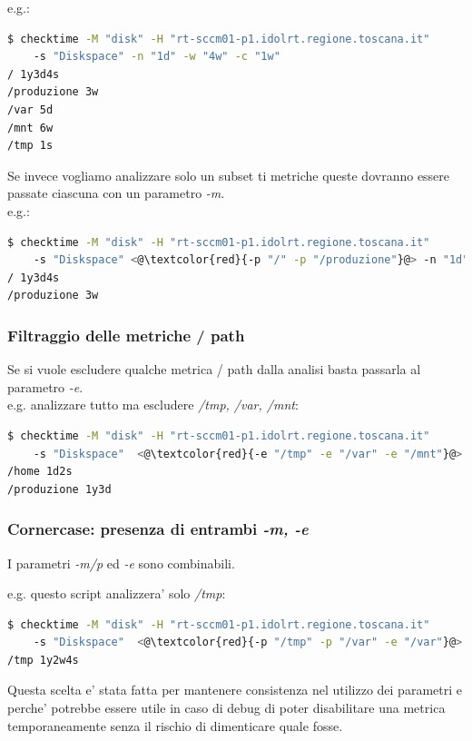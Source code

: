 \documentclass{article}
\begin{document}
e.g.:
\begin{lstlisting}[language=Bash]
$ checktime -M "disk" -H "rt-sccm01-p1.idolrt.regione.toscana.it" 
    -s "Diskspace" -n "1d" -w "4w" -c "1w"
/ 1y3d4s
/produzione 3w
/var 5d
/mnt 6w
/tmp 1s
\end{lstlisting}

Se invece vogliamo analizzare solo un subset ti metriche queste dovranno essere passate ciascuna con un parametro \textit{-m}.\\

e.g.:
\begin{lstlisting}[language=Bash]
$ checktime -M "disk" -H "rt-sccm01-p1.idolrt.regione.toscana.it" 
    -s "Diskspace" <@\textcolor{red}{-p "/" -p "/produzione"}@> -n "1d" -w "4w" -c "1w"
/ 1y3d4s
/produzione 3w
\end{lstlisting}

\subsubsection*{Filtraggio delle metriche / path}
Se si vuole escludere qualche metrica / path dalla analisi basta passarla al parametro \textit{-e}.\\

e.g. analizzare tutto ma escludere \textit{/tmp, /var, /mnt}: 
\begin{lstlisting}[language=Bash]
$ checktime -M "disk" -H "rt-sccm01-p1.idolrt.regione.toscana.it" 
    -s "Diskspace"  <@\textcolor{red}{-e "/tmp" -e "/var" -e "/mnt"}@> -n "1d" -w "4w" -c "1w"
/home 1d2s
/produzione 1y3d
\end{lstlisting}

\subsubsection*{Cornercase: presenza di entrambi \textit{-m, -e}}

I parametri \textit{-m/p} ed \textit{-e} sono combinabili.

e.g. questo script analizzera' solo \textit{/tmp}: 
\begin{lstlisting}[language=Bash]
$ checktime -M "disk" -H "rt-sccm01-p1.idolrt.regione.toscana.it" 
    -s "Diskspace"  <@\textcolor{red}{-p "/tmp" -p "/var" -e "/var"}@> -n "1d" -w "4w" -c "1w"
/tmp 1y2w4s
\end{lstlisting}

Questa scelta e' stata fatta per mantenere consistenza nel utilizzo dei parametri e perche' potrebbe essere utile in caso di debug di poter disabilitare una metrica temporaneamente senza il rischio di dimenticare quale fosse.
\end{document}
